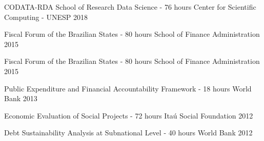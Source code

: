\begin{cvhonors}
 
  \cvhonor
    {CODATA-RDA School of Research Data Science - 76 hours}
    {Center for Scientific Computing - UNESP}
    {}
    {2018}

  \cvhonor
    {Fiscal Forum of the Brazilian States - 80 hours}
    {School of Finance Administration}
    {}
    {2015}

  \cvhonor
    {Fiscal Forum of the Brazilian States - 80 hours}
    {School of Finance Administration}
    {}
    {2015}

  \cvhonor
    {Public Expenditure and Financial Accountability Framework - 18 hours}
    {World Bank}
    {}
    {2013}

  \cvhonor
    {Economic Evaluation of Social Projects - 72 hours}
    {Itaú Social Foundation}
    {}
    {2012}

\cvhonor
    {Debt Sustainability Analysis at Subnational Level - 40 hours}
    {World Bank}
    {}
    {2012}

\end{cvhonors}